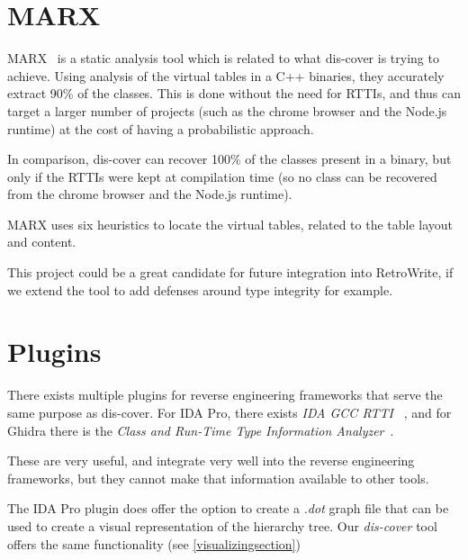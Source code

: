 \documentclass[a4paper,11pt,oneside]{report}
\begin{document}



\section{MARX}
\label{relatedworksmarx}

MARX~\cite{marx} is a static analysis tool which is related to what dis-cover
is trying to achieve. Using analysis of the virtual tables in a C++ binaries,
they accurately extract 90\% of the classes. This is done without the need for
RTTIs, and thus can target a larger number of projects (such as the chrome
browser and the Node.js runtime) at the cost of having a probabilistic
approach.

In comparison, dis-cover can recover 100\% of the classes present in a binary,
but only if the RTTIs were kept at compilation time (so no class can be
recovered from the chrome browser and the Node.js runtime).

MARX uses six heuristics to locate the virtual tables, related to the table
layout and content.

This project could be a great candidate for future integration into
RetroWrite, if we extend the tool to add defenses around type integrity for
example.


\section{Plugins}

There exists multiple plugins for reverse engineering frameworks that serve
the same purpose as dis-cover. For IDA Pro, there exists \emph{IDA GCC RTTI}
~\cite{idagccrtti}, and for Ghidra there is the \emph{Class and Run-Time
Type Information Analyzer}~\cite{ghidracppclassanalyzer}.

These are very useful, and integrate very well into the reverse engineering
frameworks, but they cannot make that information available to other tools.

The IDA Pro plugin does offer the option to create a \emph{.dot} graph file
that can be used to create a visual representation of the hierarchy tree.
Our \emph{dis-cover} tool offers the same functionality (see
\autoref{visualizingsection})
\end{document}
